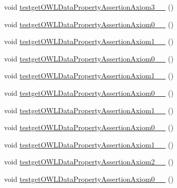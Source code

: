 \begin{DoxyCompactItemize}
\item 
void \hyperlink{classorg_1_1semanticweb_1_1owlapi_1_1api_1_1test_1_1_null_check_test_case_a30d1f818e642688fc91c2248e1dc5e8a}{testget\-O\-W\-L\-Data\-Property\-Assertion\-Axiom3\-\_\-\_} ()
\item 
void \hyperlink{classorg_1_1semanticweb_1_1owlapi_1_1api_1_1test_1_1_null_check_test_case_a501ea57edb2a3116fc3474bf7a957125}{testget\-O\-W\-L\-Data\-Property\-Assertion\-Axiom0\-\_\-\_} ()
\item 
void \hyperlink{classorg_1_1semanticweb_1_1owlapi_1_1api_1_1test_1_1_null_check_test_case_adc6b53094d9df94ea970db6306ed4839}{testget\-O\-W\-L\-Data\-Property\-Assertion\-Axiom1\-\_\-\_} ()
\item 
void \hyperlink{classorg_1_1semanticweb_1_1owlapi_1_1api_1_1test_1_1_null_check_test_case_a0cbe8f088a67f786f1e14594e1c32859}{testget\-O\-W\-L\-Data\-Property\-Assertion\-Axiom0\-\_\-\_} ()
\item 
void \hyperlink{classorg_1_1semanticweb_1_1owlapi_1_1api_1_1test_1_1_null_check_test_case_a645ddd03696165a884d388d08870b338}{testget\-O\-W\-L\-Data\-Property\-Assertion\-Axiom1\-\_\-\_} ()
\item 
void \hyperlink{classorg_1_1semanticweb_1_1owlapi_1_1api_1_1test_1_1_null_check_test_case_a8cdacbce18afbf34893478a047456456}{testget\-O\-W\-L\-Data\-Property\-Assertion\-Axiom0\-\_\-\_} ()
\item 
void \hyperlink{classorg_1_1semanticweb_1_1owlapi_1_1api_1_1test_1_1_null_check_test_case_ae01ae24839709fba5bdc366291b54131}{testget\-O\-W\-L\-Data\-Property\-Assertion\-Axiom1\-\_\-\_} ()
\item 
void \hyperlink{classorg_1_1semanticweb_1_1owlapi_1_1api_1_1test_1_1_null_check_test_case_a0fcfb83014350d87d155a1a5c8c848b1}{testget\-O\-W\-L\-Data\-Property\-Assertion\-Axiom0\-\_\-\_} ()
\item 
void \hyperlink{classorg_1_1semanticweb_1_1owlapi_1_1api_1_1test_1_1_null_check_test_case_aa7c4c901c7cf5f293fa47a1cdb55f456}{testget\-O\-W\-L\-Data\-Property\-Assertion\-Axiom1\-\_\-\_} ()
\item 
void \hyperlink{classorg_1_1semanticweb_1_1owlapi_1_1api_1_1test_1_1_null_check_test_case_a34ea7d7ebab22ed5a5f2ee67155d93d8}{testget\-O\-W\-L\-Data\-Property\-Assertion\-Axiom2\-\_\-\_} ()
\item 
void \hyperlink{classorg_1_1semanticweb_1_1owlapi_1_1api_1_1test_1_1_null_check_test_case_a59cab5402e00314fc1a53ca88717b1ac}{testget\-O\-W\-L\-Data\-Property\-Assertion\-Axiom0\-\_\-\_} ()

\end{DoxyCompactItemize}
